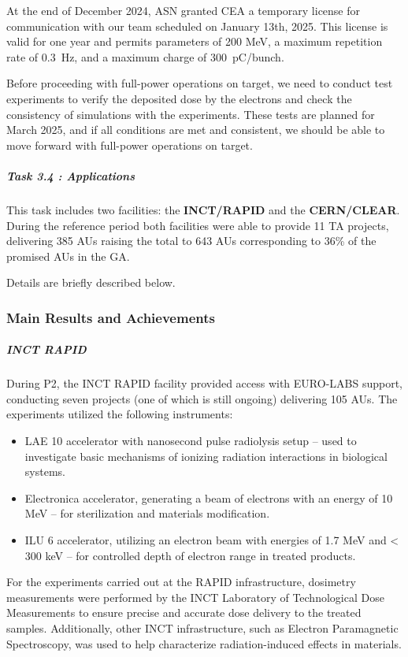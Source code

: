 {At the end of December 2024, ASN granted CEA a temporary license for communication with our team scheduled on January 13th, 2025. This license is valid for one year and permits parameters of 200 MeV, a maximum repetition rate of \SI{0.3}{Hz}, and a maximum charge of \SI{300}{\pico C/bunch}.

Before proceeding with full-power operations on target, we need to conduct test experiments to verify the deposited dose by the electrons and check the consistency of simulations with the experiments. These tests are planned for March 2025, and if all conditions are met and consistent, we should be able to move forward with full-power operations on target.


\subparagraph{Task 3.4 : Applications} \mbox{}


This task includes two facilities: the {\bf INCT/RAPID} and the {\bf CERN/CLEAR}. During the reference period both facilities were able to provide 11 TA projects, delivering 385 AUs raising the total to 643 AUs corresponding to 36\% of the promised AUs in the GA. 

Details are briefly described below. 

\subsubsection*{Main Results and Achievements}


\subparagraph*{INCT RAPID} 
During P2, the INCT RAPID facility provided access with EURO-LABS support, conducting seven projects (one of which is still ongoing) delivering 105 AUs. The experiments utilized the following instruments:
\begin{itemize}
\item LAE 10 accelerator with nanosecond pulse radiolysis setup – used to investigate basic mechanisms of ionizing radiation interactions in biological systems.
\item Electronica accelerator, generating a beam of electrons with an energy of 10 MeV – for sterilization and materials modification.
\item ILU 6 accelerator, utilizing an electron beam with energies of 1.7 MeV and < 300 keV – for controlled depth of electron range in treated products.
\end{itemize}
For the experiments carried out at the RAPID infrastructure, dosimetry measurements were performed by the INCT Laboratory of Technological Dose Measurements to ensure precise and accurate dose delivery to the treated samples. Additionally, other INCT infrastructure, such as Electron Paramagnetic Spectroscopy, was used to help characterize radiation-induced effects in materials.

}
